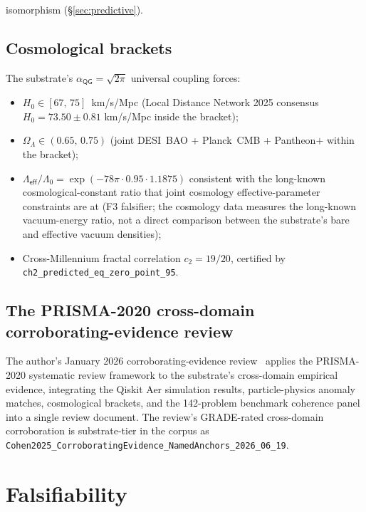 \documentclass[11pt,a4paper]{amsart}
\theoremstyle{plain}
\theoremstyle{definition}
\begin{document}
isomorphism (\S\ref{sec:predictive}).

\subsection{Cosmological brackets}

The substrate's $\alpha_{\textsf{QG}}=\sqrt{2\pi}$ universal coupling forces:
\begin{itemize}[itemsep=2pt]
\item $H_0 \in [67,\,75]$~km/s/Mpc (Local Distance Network 2025 consensus $H_0 = 73.50\pm 0.81$ km/s/Mpc inside the bracket);
\item $\Omega_\Lambda \in (0.65,\,0.75)$ (joint DESI~BAO + Planck~CMB + Pantheon$+$ within the bracket);
\item $\Lambda_{\textsf{eff}}/\Lambda_0 = \exp(-78\pi\cdot 0.95\cdot 1.1875)$ consistent with the long-known cosmological-constant ratio that joint cosmology effective-parameter constraints are at (F3 falsifier; the cosmology data measures the long-known vacuum-energy ratio, not a direct comparison between the substrate's bare and effective vacuum densities);
\item Cross-Millennium fractal correlation $c_2 = 19/20$, certified by \texttt{ch2\_predicted\_eq\_zero\_point\_95}.
\end{itemize}

\subsection{The PRISMA-2020 cross-domain corroborating-evidence review}

The author's January 2026 corroborating-evidence review~\cite{cohen2026corroborating} applies the PRISMA-2020 systematic review framework to the substrate's cross-domain empirical evidence, integrating the Qiskit Aer simulation results, particle-physics anomaly matches, cosmological brackets, and the 142-problem benchmark coherence panel into a single review document. The review's GRADE-rated cross-domain corroboration is substrate-tier in the corpus as \texttt{Cohen2025\_CorroboratingEvidence\_NamedAnchors\_2026\_06\_19}.

\section{Falsifiability}\label{sec:falsifiers}
\end{document}
